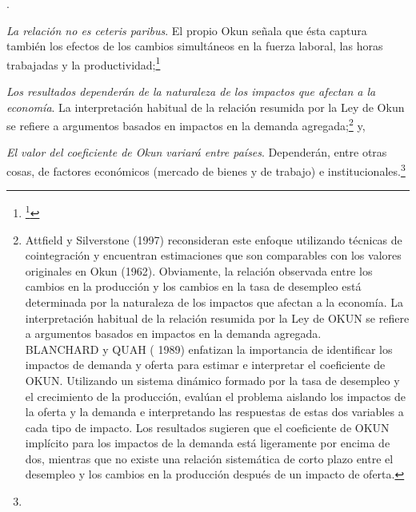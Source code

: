 \documentclass[10pt,a4paper]{article}
\newcounter{numitem}
\newenvironment{lnum}
      {\begin{list}{\arabic{numitem}.}{%
          \usecounter{numitem}%
          \setlength{\leftmargin}{1cm}%
          \setlength{\parskip}{3pt}%
          \setlength{\itemsep}{0pt}%
          \setlength{\parsep}{0pt}%
      }}
      {\end{list}}
\begin{document}
\begin{lnum}
    \item \textit{La relación no es ceteris paribus}. El propio Okun señala que ésta captura también los efectos de los cambios simultáneos en la fuerza laboral, las horas trabajadas y la productividad;\footnote{%
        \footnote{Esta regla general se propone como un promedio ponderado subjetivamente (OKUN 1962, p. 100) de las estimaciones obtenidas de las tres especificaciones. Las estimaciones basadas en datos que incluyen el período posterior a la crisis del petróleo, que se pueden encontrar en la mayoría de los libros de texto macroeconómicos modernos, tienden a revelar un coeficiente de Okun que está más cerca de dos que de tres. Los argumentos de Okun sugieren que la relación encontrada entre el desempleo y la producción no debe entenderse como una relación \textit{ceteris paribus}, sino más bien como una captura también de los efectos de los cambios, simultáneos en la fuerza laboral, las horas trabajadas y la productividad.
}
    }
    \item \textit{Los resultados dependerán de la naturaleza de los impactos que afectan a la economía}. La interpretación habitual de la relación resumida por la Ley de Okun se refiere a argumentos basados en impactos en la demanda agregada;\footnote{%
        Attfield y Silverstone (1997) reconsideran este enfoque utilizando técnicas de cointegración y encuentran estimaciones que son comparables con los valores originales en Okun (1962). Obviamente, la relación observada entre los cambios en la producción y los cambios en la tasa de desempleo está determinada por la naturaleza de los impactos que afectan a la economía. La interpretación habitual de la relación resumida por la Ley de OKUN se refiere a argumentos basados en impactos en la demanda agregada.\\
    BLANCHARD y QUAH ( 1989) enfatizan la importancia de identificar los impactos de demanda y oferta para estimar e interpretar el coeficiente de OKUN. Utilizando un sistema dinámico formado por la tasa de desempleo y el crecimiento de la producción, evalúan el problema aislando los impactos de la oferta y la demanda e interpretando las respuestas de estas dos variables a cada tipo de impacto. Los resultados sugieren que el coeficiente de OKUN implícito para los impactos de la demanda está ligeramente por encima de dos, mientras que no existe una relación sistemática de corto plazo entre el desempleo y los cambios en la producción después de un impacto de oferta.
    } y,
    \item \textit{El valor del coeficiente de Okun variará entre países}. Dependerán, entre otras cosas, de factores económicos (mercado de bienes y de trabajo) e institucionales.\footnote{
}
\end{lnum}
\end{document}
